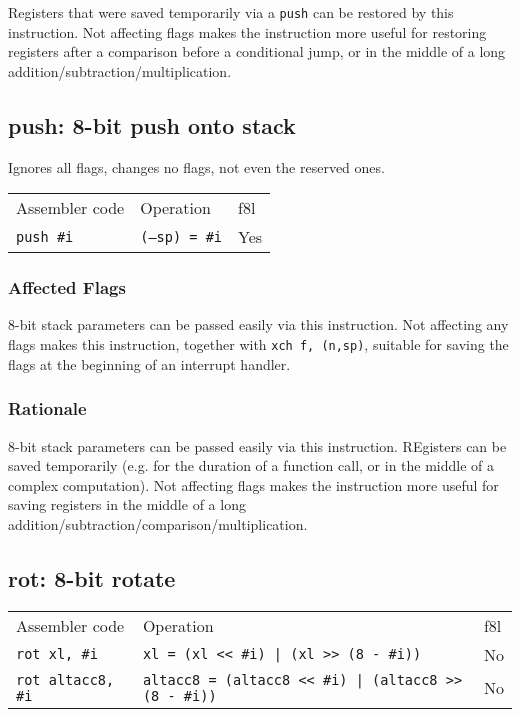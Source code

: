 \documentclass{book}
\begin{document}
Registers that were saved temporarily via a \texttt{push} can be restored by this instruction. Not affecting flags makes the instruction more useful for restoring registers after a comparison before a conditional jump, or in the middle of a long addition/subtraction/multiplication.

\subsection{push: 8-bit push onto stack}

Ignores all flags, changes no flags, not even the reserved ones.

\begin{tabular}{l l l}
Assembler code    & Operation             & f8l \\
\texttt{push \#i} & \texttt{(--sp) = \#i} & Yes
\end{tabular}

\subsubsection*{Affected Flags}

8-bit stack parameters can be passed easily via this instruction. Not affecting any flags makes this instruction, together with \texttt{xch f, (n,sp)}, suitable for saving the flags at the beginning of an interrupt handler.

\subsubsection*{Rationale}

8-bit stack parameters can be passed easily via this instruction. REgisters can be saved temporarily (e.g. for the duration of a function call, or in the middle of a complex computation). Not affecting flags makes the instruction more useful for saving registers in the middle of a long addition/subtraction/comparison/multiplication.

\subsection{rot: 8-bit rotate}

\begin{tabular}{l l l}
Assembler code            & Operation                                                    & f8l \\
\texttt{rot xl, \#i}      & \texttt{xl = (xl << \#i) | (xl >> (8 - \#i))}                & No \\
\texttt{rot altacc8, \#i} & \texttt{altacc8 = (altacc8 << \#i) | (altacc8 >> (8 - \#i))} & No \\
\end{tabular}
\end{document}
